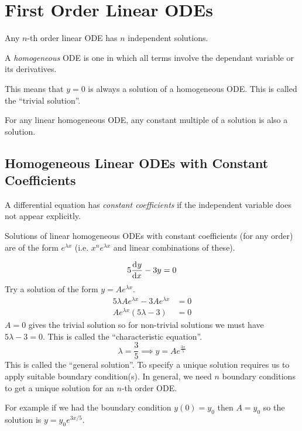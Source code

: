 \documentclass[../main.tex]{subfiles}
\begin{document}
\section{First Order Linear ODEs}
\begin{remark}
  Any $n$-th order linear ODE has $n$ independent solutions.
\end{remark}
\begin{definition}[Homogeneous]
  A \textit{homogeneous} ODE is one in which all terms involve the dependant variable or its derivatives.
\end{definition}
This means that $y = 0$ is always a solution of a homogeneous ODE.
This is called the ``trivial solution''.
\begin{remark}
  For any linear homogeneous ODE, any constant multiple of a solution is also a solution.
\end{remark}
\subsection{Homogeneous Linear ODEs with Constant Coefficients}
\begin{definition}
  A differential equation has \textit{constant coefficients} if the independent variable does not appear explicitly.
\end{definition}

Solutions of linear homogeneous ODEs with constant coefficients (for any order) are of the form $e^{\lambda x}$ (i.e. $x^{n}e^{\lambda x}$ and linear combinations of these).
\begin{example}
  \[
    5\deriv{y}{x} - 3y = 0
  \]
  Try a solution of the form $y = Ae^{\lambda x}$.
  \begin{align*}
    5\lambda Ae^{\lambda x} - 3Ae^{\lambda x} &= 0 \\
    Ae^{\lambda x}(5\lambda - 3) &= 0
  \end{align*}
  $A= 0$ gives the trivial solution so for non-trivial solutions we must have $5\lambda - 3 = 0$.
  This is called the ``characteristic equation''.
  \[
    \lambda = \frac{3}{5} \implies y = Ae^{\frac{3x}{5}}
  \]
  This is called the ``general solution''.
  To specify a unique solution requires us to apply suitable boundary condition(s).
  In general, we need $n$ boundary conditions to get a unique solution for an $n$-th order ODE.

  For example if we had the boundary condition $y(0) = y_0$ then $A = y_0$ so the solution is $y = y_0 e^{3x/5}$.
\end{example}
\end{document}
